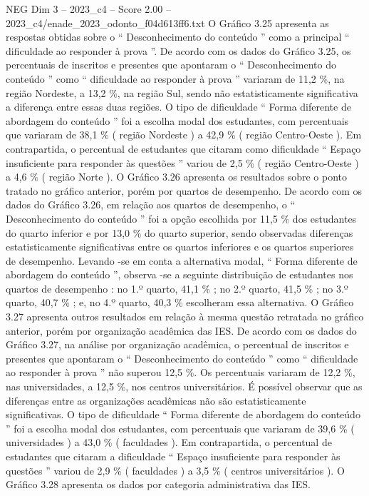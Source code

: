 \begin{textsample}{NEG Dim 3 – 2023\_c4 – Score 2.00 – 2023\_c4/enade\_2023\_odonto\_f04d613ff6.txt}
O Gráfico 3.25 apresenta as respostas obtidas sobre o “ Desconhecimento do conteúdo ” como a principal “ dificuldade ao responder à prova ”.
De acordo com os dados do Gráfico 3.25, os percentuais de inscritos e presentes que apontaram o “ Desconhecimento do conteúdo ” como “ dificuldade ao responder à prova ” variaram de 11,2 \%, na região Nordeste, a 13,2 \%, na região Sul, sendo não estatisticamente significativa a diferença entre essas duas regiões.
O tipo de dificuldade “ Forma diferente de abordagem do conteúdo ” foi a escolha modal dos estudantes, com percentuais que variaram de 38,1 \% ( região Nordeste ) a 42,9 \% ( região Centro-Oeste ).
Em contrapartida, o percentual de estudantes que citaram como dificuldade “ Espaço insuficiente para responder às questões ” variou de 2,5 \% ( região Centro-Oeste ) a 4,6 \% ( região Norte ).
O Gráfico 3.26 apresenta os resultados sobre o ponto tratado no gráfico anterior, porém por quartos de desempenho.
De acordo com os dados do Gráfico 3.26, em relação aos quartos de desempenho, o “ Desconhecimento do conteúdo ” foi a opção escolhida por 11,5 \% dos estudantes do quarto inferior e por 13,0 \% do quarto superior, sendo observadas diferenças estatisticamente significativas entre os quartos inferiores e os quartos superiores de desempenho.
Levando -se em conta a alternativa modal, “ Forma diferente de abordagem do conteúdo ”, observa -se a seguinte distribuição de estudantes nos quartos de desempenho : no 1.º quarto, 41,1 \% ; no 2.º quarto, 41,5 \% ; no 3.º quarto, 40,7 \% ; e, no 4.º quarto, 40,3 \% escolheram essa alternativa.
O Gráfico 3.27 apresenta outros resultados em relação à mesma questão retratada no gráfico anterior, porém por organização acadêmica das IES.
De acordo com os dados do Gráfico 3.27, na análise por organização acadêmica, o percentual de inscritos e presentes que apontaram o “ Desconhecimento do conteúdo ” como “ dificuldade ao responder à prova ” não superou 12,5 \%.
Os percentuais variaram de 12,2 \%, nas universidades, a 12,5 \%, nos centros universitários.
É possível observar que as diferenças entre as organizações acadêmicas não são estatisticamente significativas.
O tipo de dificuldade “ Forma diferente de abordagem do conteúdo ” foi a escolha modal dos estudantes, com percentuais que variaram de 39,6 \% ( universidades ) a 43,0 \% ( faculdades ).
Em contrapartida, o percentual de estudantes que citaram a dificuldade “ Espaço insuficiente para responder às questões ” variou de 2,9 \% ( faculdades ) a 3,5 \% ( centros universitários ).
O Gráfico 3.28 apresenta os dados por categoria administrativa das IES.

\end{textsample}
